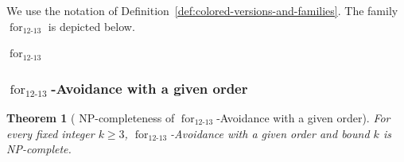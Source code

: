 \documentclass[12pt]{article}
\theoremstyle{plain}
\newtheorem{theorem}{Theorem}[section]
\theoremstyle{definition}
\theoremstyle{remark}
\theoremstyle{definition}
\newcommand{\forlabel}{\mathrm{for}}
\DeclareRobustCommand{\forparam}[1]{%
  \ensuremath{\mathop{\forlabel}\nolimits_{#1}}%
}
\begin{document}
We use the notation of
Definition~\ref{def:colored-versions-and-families}.
The family \(\forparam{12\text{-}13}\) is depicted below.

\begin{center}

\smallskip
\(\forparam{12\text{-}13}\)
\end{center}






\subsubsection{
\texorpdfstring{\(\forparam{12\text{-}13}\)-Avoidance with a given order}
{for12-13-Avoidance with a given order}
}
\label{subsubsec:for12-13-given-order}




\begin{theorem}[
NP-completeness of
\texorpdfstring{\(\forparam{12\text{-}13}\)-Avoidance with a given order}
{for12-13-Avoidance with a given order}
]
\label{thm:for12-13-given-order-np-complete}
For every fixed integer \(k\ge 3\),
\(\forparam{12\text{-}13}\)-Avoidance with a given order and bound \(k\)
is NP-complete.
\end{theorem}
\end{document}
